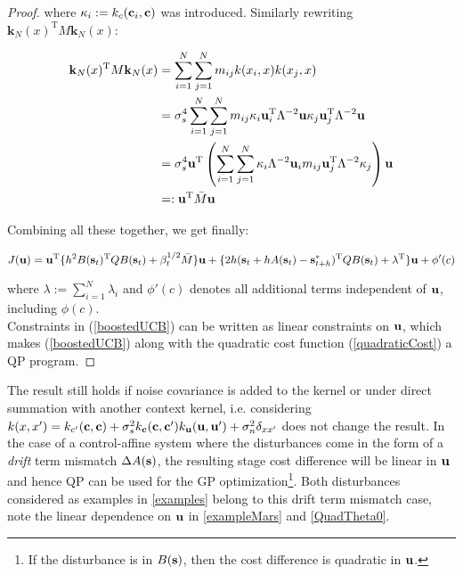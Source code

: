 \begin{proof}
where $\kappa_{i} := k_{c}(\mathbf{c}_{i},\mathbf{c})$ was introduced. Similarly rewriting $\mathbf{k}_{N}(x)^{\mathrm{T}}M\mathbf{k}_{N}(x) $:

\begin{align*}
\mathbf{k}_{N}(x)^{\mathrm{T}}M\mathbf{k}_{N}(x) &=
\sum_{i=1}^{N} \sum_{j=1}^{N}m_{ij}k(x_{i},x)k(x_{j},x) \\
&= \sigma_{s}^{4}\sum_{i=1}^{N} \sum_{j=1}^{N}m_{ij}\kappa_{i}\mathbf{u}_{i}^{\mathrm{T}}\Lambda^{-2}\mathbf{u} \kappa_{j}\mathbf{u}_{j}^{\mathrm{T}}\Lambda^{-2}\mathbf{u} \\
&= \sigma_{s}^{4}\mathbf{u}^{\mathrm{T}} \left( \sum_{i=1}^{N} \sum_{j=1}^{N}\kappa_{i} \Lambda^{-2} \mathbf{u}_{i} m_{ij} \mathbf{u}_{j}^{\mathrm{T} }\Lambda^{-2} \kappa_{j} \right) \mathbf{u} \\
&=: \mathbf{u}^{\mathrm{T}}\bar{M}\mathbf{u}
\end{align*}

Combining all these together, we get finally:

\begin{equation}
J(\mathbf{u}) = \mathbf{u}^{\mathrm{T}} \lbrace h^{2}B(\mathbf{s}_{t})^{\mathrm{T}}QB(\mathbf{s}_{t}) + \beta_t^{1/2}\bar{M} \rbrace \mathbf{u} + \lbrace 2h(\mathbf{s}_{t} + hA(\mathbf{s}_{t}) - \mathbf{s}^{*}_{t+h})^{\mathrm{T}}QB(\mathbf{s}_{t}) + \lambda^{\mathrm{T}} \rbrace \mathbf{u} + \phi'(c)
\label{quadraticCost}
\end{equation}

where $\lambda := \sum\limits_{i=1}^{N} \lambda_{i}$ and $\phi'(c)$ denotes all additional terms independent of $\mathbf{u}$, including $\phi(c)$. \\ 

Constraints in (\ref{boostedUCB}) can be written as linear constraints on $\mathbf{u}$, which makes (\ref{boostedUCB}) along with the quadratic cost function (\ref{quadraticCost}) a QP program.

\end{proof}
The result still holds if noise covariance is added to the kernel or under direct summation with another context kernel, i.e. considering $k(x,x') = k_{c'}(\mathbf{c}, \mathbf{c}) + \sigma_{s}^{2}k_{\mathbf{c}}(\mathbf{c},\mathbf{c}')k_{\mathbf{u}}(\mathbf{u},\mathbf{u}') + \sigma_{n}^{2}\delta_{xx'}$ does not change the result. In the case of a control-affine system where the disturbances come in the form of a \emph{drift} term mismatch $\Delta A(\mathbf{s})$, the resulting stage cost difference will be linear in $\mathbf{u}$ and hence QP can be used for the GP optimization\footnote{If the disturbance is in $B(\mathbf{s})$, then the cost difference is quadratic in $\mathbf{u}$.}. Both disturbances considered as examples in \ref{examples} belong to this drift term mismatch case, note the linear dependence on $\mathbf{u}$ in \eqref{exampleMars} and \eqref{QuadTheta0}.

